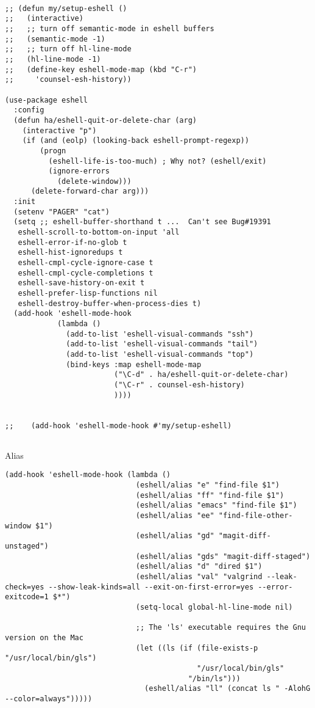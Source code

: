 \documentclass[12pt]{article}
\begin{document}
\begin{verbatim}

;; (defun my/setup-eshell ()
;;   (interactive)
;;   ;; turn off semantic-mode in eshell buffers
;;   (semantic-mode -1)
;;   ;; turn off hl-line-mode
;;   (hl-line-mode -1)
;;   (define-key eshell-mode-map (kbd "C-r")
;;     'counsel-esh-history))

(use-package eshell
  :config
  (defun ha/eshell-quit-or-delete-char (arg)
    (interactive "p")
    (if (and (eolp) (looking-back eshell-prompt-regexp))
        (progn
          (eshell-life-is-too-much) ; Why not? (eshell/exit)
          (ignore-errors
            (delete-window)))
      (delete-forward-char arg)))
  :init
  (setenv "PAGER" "cat")
  (setq ;; eshell-buffer-shorthand t ...  Can't see Bug#19391
   eshell-scroll-to-bottom-on-input 'all
   eshell-error-if-no-glob t
   eshell-hist-ignoredups t
   eshell-cmpl-cycle-ignore-case t
   eshell-cmpl-cycle-completions t
   eshell-save-history-on-exit t
   eshell-prefer-lisp-functions nil
   eshell-destroy-buffer-when-process-dies t)
  (add-hook 'eshell-mode-hook
            (lambda ()
              (add-to-list 'eshell-visual-commands "ssh")
              (add-to-list 'eshell-visual-commands "tail")
              (add-to-list 'eshell-visual-commands "top")
              (bind-keys :map eshell-mode-map
                         ("\C-d" . ha/eshell-quit-or-delete-char)
                         ("\C-r" . counsel-esh-history)
                         ))))


;;    (add-hook 'eshell-mode-hook #'my/setup-eshell)


\end{verbatim}

Alias
\begin{verbatim}
(add-hook 'eshell-mode-hook (lambda ()
                              (eshell/alias "e" "find-file $1")
                              (eshell/alias "ff" "find-file $1")
                              (eshell/alias "emacs" "find-file $1")
                              (eshell/alias "ee" "find-file-other-window $1")
                              (eshell/alias "gd" "magit-diff-unstaged")
                              (eshell/alias "gds" "magit-diff-staged")
                              (eshell/alias "d" "dired $1")
                              (eshell/alias "val" "valgrind --leak-check=yes --show-leak-kinds=all --exit-on-first-error=yes --error-exitcode=1 $*")
                              (setq-local global-hl-line-mode nil)

                              ;; The 'ls' executable requires the Gnu version on the Mac
                              (let ((ls (if (file-exists-p "/usr/local/bin/gls")
                                            "/usr/local/bin/gls"
                                          "/bin/ls")))
                                (eshell/alias "ll" (concat ls " -AlohG --color=always")))))
\end{verbatim}
\end{document}
